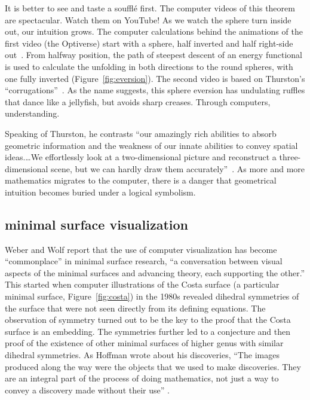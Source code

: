 \documentclass{llncs}
\begin{document}
It is better to see and taste a souffl\'e first.  The computer videos
of this theorem are spectacular.  Watch them on YouTube!  As we watch
the sphere turn inside out, our intuition grows.  The computer
calculations behind the animations of the first video (the Optiverse)
start with a sphere, half inverted and half right-side out~\cite{SFL}.
From halfway position, the path of steepest descent of an energy
functional is used to calculate the unfolding in both directions to
the round spheres, with one fully inverted
(Figure~\ref{fig:eversion}).  The second video is based on Thurston's
``corrugations''~\cite{LMM}. As the name suggests, this sphere
eversion has undulating ruffles that dance like a jellyfish, but
avoids sharp creases.  Through computers, understanding.

Speaking of Thurston, he contrasts ``our amazingly rich abilities to
absorb geometric information and the weakness of our innate abilities
to convey spatial ideas.\ldots We effortlessly look at a
two-dimensional picture and reconstruct a three-dimensional scene, but
we can hardly draw them accurately''~\cite{Pi11}.  As more and more
mathematics migrates to the computer, there is a danger that
geometrical intuition becomes buried under a logical symbolism.

\subsection{minimal surface visualization} 

Weber and Wolf \cite{WW11} report that the use of computer
visualization has become ``commonplace'' in minimal surface research,
``a conversation between visual aspects of the minimal surfaces and
advancing theory, each supporting the other.''  This started when
computer illustrations of the Costa surface (a particular minimal
surface, Figure~\ref{fig:costa}) in the 1980s revealed dihedral
symmetries of the surface that were not seen directly from its
defining equations.  The observation of symmetry turned out to be the
key to the proof that the Costa surface is an embedding.  The
symmetries further led to a conjecture and then proof of the existence
of other minimal surfaces of higher genus with similar dihedral
symmetries.  As Hoffman wrote about his discoveries, ``The images
produced along the way were the objects that we used to make
discoveries. They are an integral part of the process of doing
mathematics, not just a way to convey a discovery made without their
use'' \cite{Hoffman}.
\end{document}
